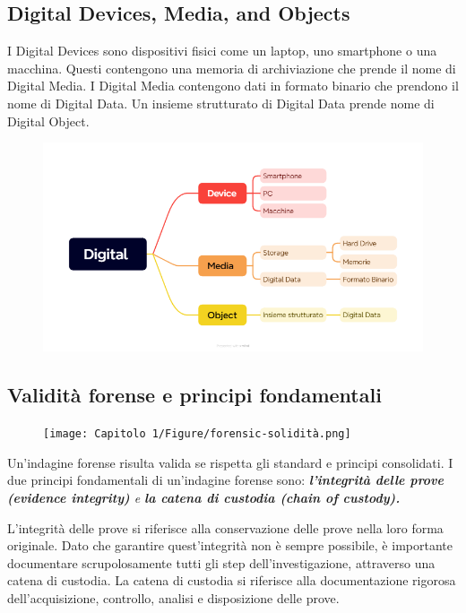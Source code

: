 \subsection{Digital Devices, Media, and Objects}
I Digital Devices sono dispositivi fisici come un laptop, uno smartphone o una macchina. Questi contengono una memoria di archiviazione che prende il nome di Digital Media. I Digital Media contengono dati in formato binario che prendono il nome di Digital Data. Un insieme strutturato di Digital Data prende nome di Digital Object.
\begin{figure}[h]
    \includegraphics[width=\textwidth]{Capitolo 1/Figure/schema-digital-devices-media-object.png}
\end{figure}

\clearpage
\subsection{Validità forense e principi fondamentali}
\begin{figure}[h]
    \texttt{[image: Capitolo 1/Figure/forensic-solidità.png]}
\end{figure}

Un'indagine forense risulta valida se rispetta gli standard e principi consolidati.
I due principi fondamentali di un'indagine forense sono: \textit{\textbf{l'integrità delle prove (evidence integrity)} e \textbf{la catena di custodia (chain of custody).}}

L'integrità delle prove si riferisce alla conservazione delle prove nella loro forma originale.
Dato che garantire quest'integrità non è sempre possibile, è importante documentare scrupolosamente tutti gli step dell'investigazione, attraverso una catena di custodia.
La catena di custodia si riferisce alla documentazione rigorosa dell'acquisizione, controllo, analisi e disposizione delle prove.


